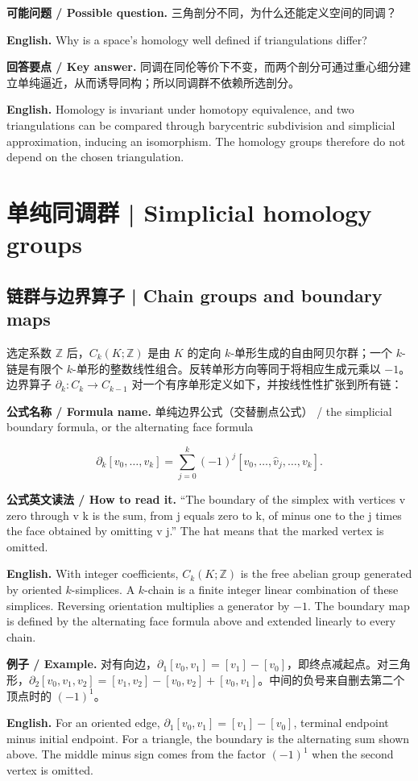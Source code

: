 \documentclass[UTF8,11pt,a4paper]{ctexart}
\newcommand{\EN}[1]{\par\noindent\textbf{English.} #1\par}
\newcommand{\READ}[1]{\par\noindent\textbf{公式英文读法 / How to read it.} #1\par}
\newcommand{\FORMULA}[2]{\par\noindent\textbf{公式名称 / Formula name.} #1 / #2\par}
\newcommand{\EX}[2]{\par\noindent\textbf{例子 / Example.} #1\par\EN{#2}}
\newcommand{\ASK}[4]{\par\noindent\textbf{可能问题 / Possible question.} #1\par\EN{#2}\noindent\textbf{回答要点 / Key answer.} #3\par\EN{#4}\medskip}
\begin{document}
\ASK{三角剖分不同，为什么还能定义空间的同调？}{Why is a space's homology well defined if triangulations differ?}{同调在同伦等价下不变，而两个剖分可通过重心细分建立单纯逼近，从而诱导同构；所以同调群不依赖所选剖分。}{Homology is invariant under homotopy equivalence, and two triangulations can be compared through barycentric subdivision and simplicial approximation, inducing an isomorphism. The homology groups therefore do not depend on the chosen triangulation.}

\section{单纯同调群 | Simplicial homology groups}
\subsection{链群与边界算子 | Chain groups and boundary maps}
\noindent 选定系数 $\mathbb Z$ 后，$C_k(K;\mathbb Z)$ 是由 $K$ 的定向 $k$-单形生成的自由阿贝尔群；一个 $k$-链是有限个 $k$-单形的整数线性组合。反转单形方向等同于将相应生成元乘以 $-1$。边界算子 $\partial_k:C_k\to C_{k-1}$ 对一个有序单形定义如下，并按线性性扩张到所有链：
\FORMULA{单纯边界公式（交替删点公式）}{the simplicial boundary formula, or the alternating face formula}
\[
\partial_k[v_0,\ldots,v_k]=\sum_{j=0}^{k}(-1)^j[v_0,\ldots,\widehat v_j,\ldots,v_k].
\]
\READ{“The boundary of the simplex with vertices v zero through v k is the sum, from j equals zero to k, of minus one to the j times the face obtained by omitting v j.” The hat means that the marked vertex is omitted.}
\EN{With integer coefficients, $C_k(K;\mathbb Z)$ is the free abelian group generated by oriented $k$-simplices. A $k$-chain is a finite integer linear combination of these simplices. Reversing orientation multiplies a generator by $-1$. The boundary map is defined by the alternating face formula above and extended linearly to every chain.}
\EX{对有向边，$\partial_1[v_0,v_1]=[v_1]-[v_0]$，即终点减起点。对三角形，$\partial_2[v_0,v_1,v_2]=[v_1,v_2]-[v_0,v_2]+[v_0,v_1]$。中间的负号来自删去第二个顶点时的 $(-1)^1$。}{For an oriented edge, $\partial_1[v_0,v_1]=[v_1]-[v_0]$, terminal endpoint minus initial endpoint. For a triangle, the boundary is the alternating sum shown above. The middle minus sign comes from the factor $(-1)^1$ when the second vertex is omitted.}
\end{document}
